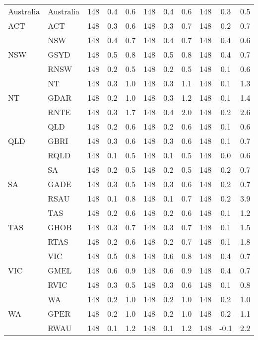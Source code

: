 \begin{table}[!ht]
{\begin{tabular}{llccccccccc}
 
    Australia & Australia & 148   & 0.4 & 0.6 & 148   & 0.4 & 0.6 & 148   & 0.3 & 0.5 \\
    ACT   & ACT   & 148   & 0.3 & 0.6 & 148   & 0.3 & 0.7 & 148   & 0.2 & 0.7 \\
    \multirow{3}[0]{*}{NSW} & NSW   & 148   & 0.4 & 0.7 & 148   & 0.4 & 0.7 & 148   & 0.4 & 0.6 \\
          & GSYD  & 148   & 0.5 & 0.8 & 148   & 0.5 & 0.8 & 148   & 0.4 & 0.7 \\
          & RNSW  & 148   & 0.2 & 0.5 & 148   & 0.2 & 0.5 & 148   & 0.1 & 0.6 \\
    \multirow{3}[0]{*}{NT} & NT    & 148   & 0.3 & 1.0 & 148   & 0.3 & 1.1 & 148   & 0.1 & 1.3 \\
          & GDAR  & 148   & 0.2 & 1.0 & 148   & 0.3 & 1.2 & 148   & 0.1 & 1.4 \\
          & RNTE  & 148   & 0.3 & 1.7 & 148   & 0.4 & 2.0 & 148   & 0.2 & 2.6 \\
    \multirow{3}[0]{*}{QLD} & QLD   & 148   & 0.2 & 0.6 & 148   & 0.2 & 0.6 & 148   & 0.1 & 0.6 \\
          & GBRI  & 148   & 0.3 & 0.6 & 148   & 0.3 & 0.6 & 148   & 0.1 & 0.7 \\
          & RQLD  & 148   & 0.1 & 0.5 & 148   & 0.1 & 0.5 & 148   & 0.0 & 0.6 \\
    \multirow{3}[0]{*}{SA} & SA    & 148   & 0.2 & 0.5 & 148   & 0.2 & 0.5 & 148   & 0.2 & 0.7 \\
          & GADE  & 148   & 0.3 & 0.5 & 148   & 0.3 & 0.6 & 148   & 0.2 & 0.7 \\
          & RSAU  & 148   & 0.1 & 0.8 & 148   & 0.1 & 0.7 & 148   & 0.2 & 3.9 \\
    \multirow{3}[0]{*}{TAS} & TAS   & 148   & 0.2 & 0.6 & 148   & 0.2 & 0.6 & 148   & 0.1 & 1.2 \\
          & GHOB  & 148   & 0.3 & 0.7 & 148   & 0.3 & 0.7 & 148   & 0.1 & 1.5 \\
          & RTAS  & 148   & 0.2 & 0.6 & 148   & 0.2 & 0.7 & 148   & 0.1 & 1.8 \\
    \multirow{3}[0]{*}{VIC} & VIC   & 148   & 0.5 & 0.8 & 148   & 0.6 & 0.8 & 148   & 0.4 & 0.7 \\
          & GMEL  & 148   & 0.6 & 0.9 & 148   & 0.6 & 0.9 & 148   & 0.4 & 0.7 \\
          & RVIC  & 148   & 0.3 & 0.5 & 148   & 0.3 & 0.6 & 148   & 0.1 & 0.8 \\
    \multirow{3}[1]{*}{WA} & WA    & 148   & 0.2 & 1.0 & 148   & 0.2 & 1.0 & 148   & 0.2 & 1.0 \\
          & GPER  & 148   & 0.2 & 1.0 & 148   & 0.2 & 1.0 & 148   & 0.2 & 1.1 \\
          & RWAU  & 148   & 0.1 & 1.2 & 148   & 0.1 & 1.2 & 148   & -0.1 & 2.2 \\


\end{tabular}}
\end{table}

